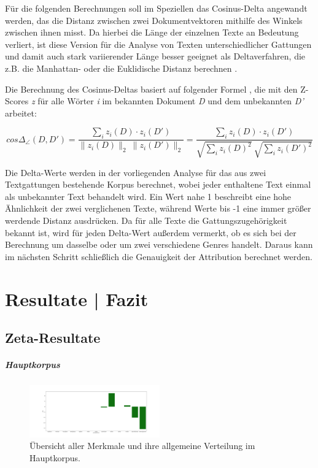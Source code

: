 \documentclass[a4paper,10p]{article}
\begin{document}
Für die folgenden Berechnungen soll im Speziellen das Cosinus-Delta angewandt werden, das die Distanz zwischen zwei Dokumentvektoren mithilfe des Winkels zwischen ihnen misst. Da hierbei die Länge der einzelnen Texte an Bedeutung verliert, ist diese Version für die Analyse von Texten unterschiedlicher Gattungen und damit auch stark variierender Länge besser geeignet als Deltaverfahren, die z.B. die Manhattan- oder die Euklidische Distanz berechnen \citep[vgl.][S. ii9]{Evert2017a}.\par 

Die Berechnung des Cosinus-Deltas basiert auf folgender Formel \citep[vgl.][S. ii6]{Evert2017a}, die mit den Z-Scores \textit{z} für alle Wörter \textit{i} im bekannten Dokument \textit{D} und dem unbekannten \textit{D’} arbeitet:\\


	 \begin{equ}[!h]
		\begin{equation}
		cos \Delta_\angle (D, D') = \frac{\sum_i z_i(D) \cdot z_i(D')}{\|z_i(D)\|_2 \ \|z_i(D')\|_2} = \frac{\sum_i z_i(D) \cdot z_i(D')}{\sqrt{\sum_i z_i(D)^2} \ \sqrt{\sum_i z_i(D')^2}}
		\end{equation}
	\end{equ}


Die Delta-Werte werden in der vorliegenden Analyse für das aus zwei Textgattungen bestehende Korpus berechnet, wobei jeder enthaltene Text einmal als unbekannter Text behandelt wird. Ein Wert nahe 1 beschreibt eine hohe Ähnlichkeit der zwei verglichenen Texte, während Werte bis -1 eine immer größer werdende Distanz ausdrücken. Da für alle Texte die Gattungszugehörigkeit  bekannt ist, wird für jeden Delta-Wert außerdem vermerkt, ob es sich bei der Berechnung um dasselbe oder um zwei verschiedene Genres handelt. Daraus kann im nächsten Schritt schließlich die Genauigkeit der Attribution berechnet werden.


\section{Resultate | Fazit}
\subsection{Zeta-Resultate}
\subparagraph{Hauptkorpus} \quad \par 

\begin{figure}
	\includegraphics[width=0.5\textwidth]{haupt_alle_merkmale.png}
	\caption{Übersicht aller Merkmale und ihre allgemeine Verteilung im Hauptkorpus.}
	\label{fig:haupt_alle_merkmale}
\end{figure}
\end{document}
